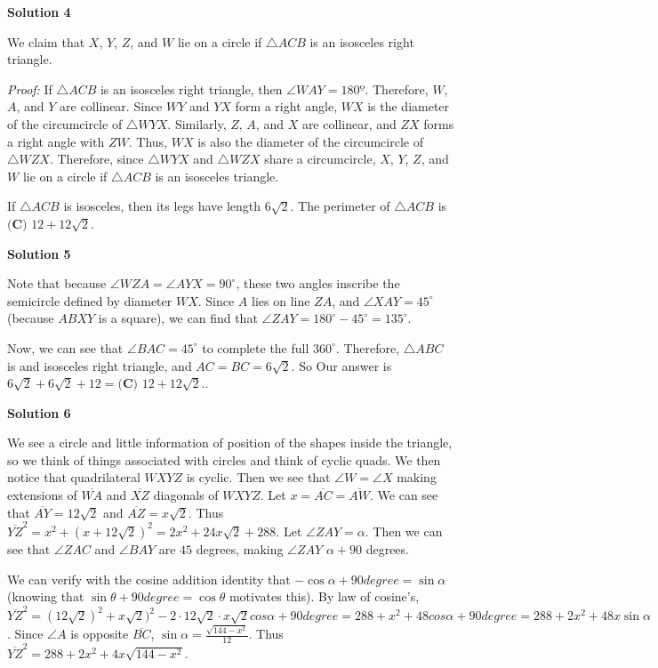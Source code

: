 \begin{enumerate}
\textbf{Solution 4}

We claim that $X$, $Y$, $Z$, and $W$ lie on a circle if $\triangle ACB$ is an isosceles right triangle.

 \textit{Proof:} If $\triangle ACB$ is an isosceles right triangle, then $\angle WAY=180º$. Therefore, $W$, $A$, and $Y$ are collinear. Since $WY$ and $YX$ form a right angle, $WX$ is the diameter of the circumcircle of $\triangle WYX$. Similarly, $Z$, $A$, and $X$ are collinear, and $ZX$ forms a right angle with $ZW$. Thus, $WX$ is also the diameter of the circumcircle of $\triangle WZX$. Therefore, since $\triangle WYX$ and $\triangle WZX$ share a circumcircle, $X$, $Y$, $Z$, and $W$ lie on a circle if $\triangle ACB$ is an isosceles triangle.

 If $\triangle ACB$ is isosceles, then its legs have length $6\sqrt{2}$. The perimeter of $\triangle ACB$ is $\boxed{\textbf{(C) }12+12\sqrt{2}}$.

 



\textbf{Solution 5}

Note that because $\angle WZA=\angle AYX=90^\circ$, these two angles inscribe the semicircle defined by diameter $WX$. Since $A$ lies on line $ZA$, and $\angle XAY=45^\circ$ (because $ABXY$ is a square), we can find that $\angle ZAY= 180^\circ - 45^\circ = 135^\circ$.

 Now, we can see that $\angle BAC=45^\circ$ to complete the full $360^\circ$. Therefore, $\triangle ABC$ is and isosceles right triangle, and $AC=BC=6\sqrt2$. So Our answer is $6\sqrt2 + 6\sqrt 2 + 12 = \boxed{\textbf{(C) }12+12\sqrt{2}}$..

 



\textbf{Solution 6}

We see a circle and little information of position of the shapes inside the triangle, so we think of things associated with circles and think of cyclic quads. We then notice that quadrilateral $WXYZ$ is cyclic. Then we see that $\angle W = \angle X$ making extensions of $\overline{WA}$ and $\overline{XZ}$ diagonals of $WXYZ$. Let $x = \overline{AC}=\overline{AW}$. We can see that $\overline{AY} = 12\sqrt{2}$ and $\overline{AZ} = x\sqrt{2}$. Thus $\overline{YZ}^2 = x^2 + (x+12\sqrt{2})^2 = 2x^2 + 24x\sqrt{2} + 288$. Let $\angle ZAY = \alpha$. Then we can see that $\angle ZAC$ and $\angle BAY$ are $45$ degrees, making $\angle ZAY$ $\alpha + 90$ degrees.

 We can verify with the cosine addition identity that $-\cos{\alpha + 90 degree} = \sin{\alpha}$ (knowing that $\sin{\theta + 90 degree} = \cos{\theta}$ motivates this). By law of cosine's, $\overline{YZ}^2 = (12\sqrt{2})^2 + x\sqrt{2})^2 - 2\cdot 12\sqrt{2} \cdot x\sqrt{2}cos{\alpha + 90 degree} = 288 + x^2 + 48cos{\alpha + 90 degree} = 288 + 2x^2 + 48x\sin{\alpha}$. Since $\angle{A}$ is opposite $\overline{BC}$, $\sin{\alpha} = \frac{\sqrt{144-x^2}}{12}$. Thus $\overline{YZ}^2 = 288 + 2x^2 + 4x\sqrt{144-x^2}$.


\end{enumerate}
